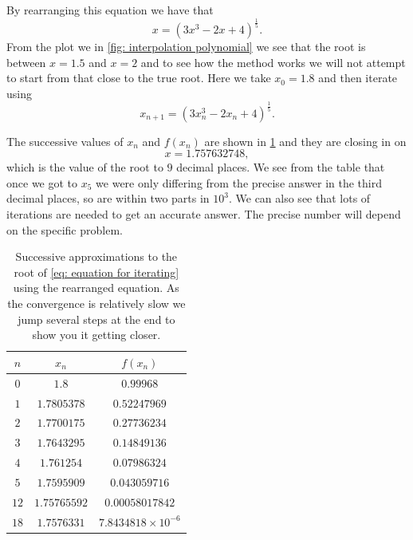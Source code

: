 By rearranging this equation we have that
\begin{equation*}
x=\left(3x^{3}-2x+4\right)^{\frac{1}{5}}.
\end{equation*}
From the plot we in \cref{fig: interpolation polynomial} we see that the root is between $x=1.5$ and $x=2$ and to see how the method works we will not attempt to start from that close to the true root. Here we take $x_{0}=1.8$ and then iterate using 
\begin{equation*}
x_{n+1}=\left(3x_{n}^{3}-2x_{n}+4\right)^{\frac{1}{5}}.
\end{equation*}

The successive values of $x_{n}$ and $f(x_{n})$ are shown in \cref{table:1} and they are closing in on
\begin{equation}
x=1.757632748,
\label{eq: precise root}
\end{equation} 
which is the value of the root to $9$ decimal places. We see from the table that once we got to $x_{5}$ we were only differing from the precise answer in the third decimal places, so are within two parts in $10^{3}$. We can also see that lots of iterations are needed to get an accurate answer. The precise number will depend on the specific problem. \\


\begin{table}[ht]
\centering
\caption{Successive approximations to the root of \cref{eq: equation for iterating} using the rearranged equation. As the convergence is relatively slow we jump several steps at the end to show you it getting closer.}

\vspace{2mm}

\label{table:1}



\begin{tabular}{|c|c|c|} 
 \hline
$n$& $x_{n}$ &$f(x_{n})$\\
 \hline
 $0$ & $1.8$ & $0.99968$ \\
 \hline
$1$ &$1.7805378$ & $0.52247969$ \\
\hline
$2$ &$1.7700175$ & $0.27736234$	\\
\hline
$3$ & $1.7643295$& $0.14849136$\\
\hline
$4$ & $1.761254$& $0.07986324$\\
\hline
$5$ & $1.7595909$ & $0.043059716$\\
\hline
$12$ &$1.75765592$ &$0.00058017842$\\
\hline
$18$ &$1.7576331$& $7.8434818\times10^{-6}$\\
\hline
\end{tabular}
\end{table}

